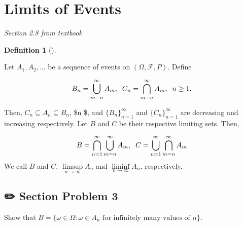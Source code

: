 \documentclass[
  letterpaper,
  DIV=11,
  numbers=noendperiod]{scrreprt}
\theoremstyle{definition}
\newtheorem{definition}{Definition}[chapter]
\theoremstyle{plain}
\theoremstyle{remark}
\begin{document}
\hypertarget{limits-of-events}{%
\section*{Limits of Events}\label{limits-of-events}}


\emph{Section 2.8 from textbook}

\leavevmode{}%
\begin{definition}[]\label{def-lim}

Let \(A_1, A_2,...\) be a sequence of events on
\((\Omega, \mathcal{F}, P)\). Define

\[B_n = \bigcup_{m=n}^{\infty} A_m ,\hspace{0.2cm} C_n = \bigcap_{m=n}^{\infty} A_m, \hspace{0.2cm} n\geq 1 .\]

Then, \(C_n \subseteq A_n \subseteq B_n\), \$\forall n \$, and
\(\{B_n\}^{\infty}_{n=1}\) and \(\{C_n\}^{\infty}_{n=1}\) are decreasing
and increasing respectively. Let \(B\) and \(C\) be their respective
limiting sets. Then,

\[B = \bigcap_{n=1}^{\infty}\bigcup_{m=n}^{\infty} A_m ,\hspace{0.2cm} C = \bigcup_{n=1}^{\infty} \bigcap_{m=n}^{\infty} A_m  \]
We call \(B\) and \(C\), \(\limsup\limits_{n \to \infty}A_n\) and
\(\liminf \limits_{n \to \infty}A_n\), respectively.

\end{definition}

\hypertarget{section-problem-3}{%
\subsection*{✏️ Section Problem 3}\label{section-problem-3}}

Show that
\(B = \{\omega \in \Omega : \omega \in A_n \text{ for infinitely many values of } n\}\).
\end{document}
